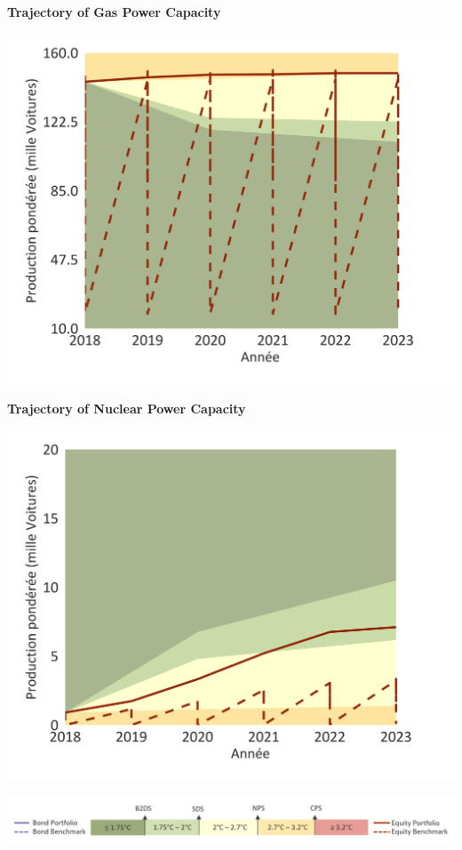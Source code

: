 \documentclass[10pt,table,a4]{article}\usepackage[]{graphicx}\usepackage[]{color}
\begin{document}
	\begin{minipage}[t]{.49\textwidth}
		\textbf{Trajectory of Gas Power Capacity }
		
		\includegraphics[trim = {0 0cm 0 0},width=1\linewidth]{ReportOutputs/Fig24}
		
		\textbf{Trajectory of Nuclear Power Capacity }
		
		\includegraphics[trim = {0 0cm 0 0},width=1\linewidth]{ReportOutputs/Fig25}
		
	\end{minipage}
	
	\vspace{-0.6cm}
	\begin{center}
		\includegraphics[trim = {0 0cm 0 0},width=.9\linewidth]{ReportGraphics/246Legend.png}
	\end{center}
\end{document}
